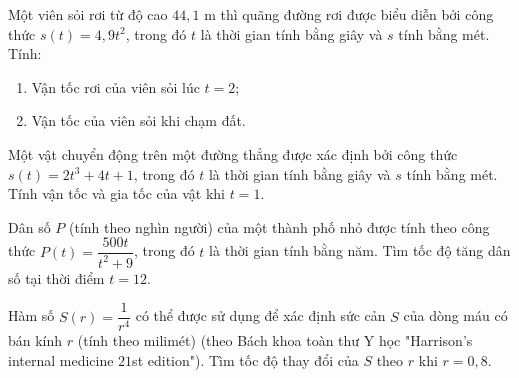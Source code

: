 \begin{bt}%
	Một viên sỏi rơi từ độ cao $44,1$ m thì quãng đường rơi được biểu diễn bởi công thức $s(t)=4,9t^2$, trong đó $t$ là thời gian tính bằng giây và $s$ tính bằng mét. Tính:
	\begin{enumerate}
	\item Vận tốc rơi của viên sỏi lúc $t=2$;
	\item Vận tốc của viên sỏi khi chạm đất.
	\end{enumerate}
\end{bt}
\begin{bt}%
	Một vật chuyển động trên một đường thẳng được xác định bởi công thức $s(t)=2t^3+4t+1$, trong đó $t$ là thời gian tính bằng giây và $s$ tính bằng mét. Tính vận tốc và gia tốc của vật khi $t=1$.
\end{bt}
\begin{bt}%
	Dân số $P$ (tính theo nghìn người) của một thành phố nhỏ được tính theo công thức $P(t)=\dfrac{500t}{t^2+9}$, trong đó $t$ là thời gian tính bằng năm. Tìm tốc độ tăng dân số tại thời điểm $t=12$.
\end{bt}
\begin{bt}%
	Hàm số $S(r)=\dfrac{1}{r^4}$ có thể được sử dụng để xác định sức cản $S$ của dòng máu có bán kính $r$ (tính theo milimét) (theo Bách khoa toàn thư Y học "Harrison's internal medicine $21$st edition"). Tìm tốc độ thay đổi của $S$ theo $r$ khi $r=0,8$.
\end{bt}
